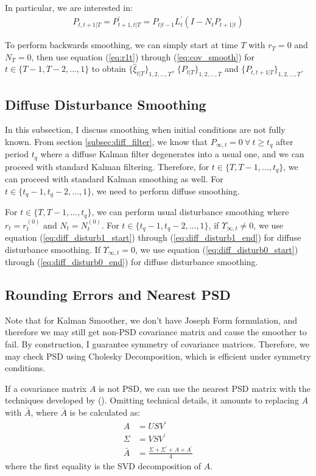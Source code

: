 \documentclass[12pt]{article}
\numberwithin{equation}{section}
\begin{document}
In particular, we are interested in:
\begin{align}
    P_{t,t+1|T} = P_{t+1,t|T}^{'} = P_{t|t-1}L_t^{'}(I-N_tP_{t+1|t}) \label{eq:cov_smooth}
\end{align}

To perform backwards smoothing, we can simply start at time $T$ with $r_T=0$ and $N_T=0$, then use equation (\ref{eq:r1t}) through (\ref{eq:cov_smooth}) for $t\in\{T-1,T-2,...,1\}$ to obtain $\{\hat{\xi}_{t|T}\}_{1,2,...,T}$, $\{P_{t|T}\}_{1,2,...,T}$ and $\{P_{t,t+1|T}\}_{1,2,...,T}$.

\subsection{Diffuse Disturbance Smoothing}
In this subsection, I discuss smoothing when initial conditions are not fully known. From section \ref{subsec:diff_filter}, we know that $P_{\infty,t}=0 \ \forall\ t\geq t_q$ after period $t_q$ where a diffuse Kalman filter degenerates into a usual one, and we can proceed with standard Kalman filtering. Therefore, for $t\in \{T,T-1,...,t_q\}$, we can proceed with standard Kalman smoothing as well. For $t\in\{t_q-1,t_q-2,...,1\}$, we need to perform diffuse smoothing.

For $t\in\{T,T-1,...,t_q\}$, we can perform usual disturbance smoothing where $r_t=r_t^{(0)}$ and $N_t=N_t^{(0)}$. For $t\in\{t_q-1,t_q-2,...,1\}$, if $\Upsilon_{\infty,t}\neq0$, we use equation (\ref{eq:diff_disturb1_start}) through (\ref{eq:diff_disturb1_end}) for diffuse disturbance smoothing. If $\Upsilon_{\infty,t}=0$, we use equation (\ref{eq:diff_disturb0_start}) through (\ref{eq:diff_disturb0_end}) for diffuse disturbance smoothing. 

\subsection{Rounding Errors and Nearest PSD}
Note that for Kalman Smoother, we don't have Joseph Form formulation, and therefore we may still get non-PSD covariance matrix and cause the smoother to fail. By construction, I guarantee symmetry of covariance matrices. Therefore, we may check PSD using Cholesky Decomposition, which is efficient under symmetry conditions.

If a covariance matrix $A$ is not PSD, we can use the nearest PSD matrix with the techniques developed by (\cite{higham_1988}). Omitting technical details, it amounts to replacing $A$ with $\bar{A}$, where $\bar{A}$ is be calculated as:
\begin{align*}
    A &= USV^{'} \\
    \Sigma &= VSV^{'} \\
    \bar{A} &= \frac{\Sigma + \Sigma^{'} + A + A^{'}}{4}
\end{align*}
where the first equality is the SVD decomposition of $A$.
\end{document}
